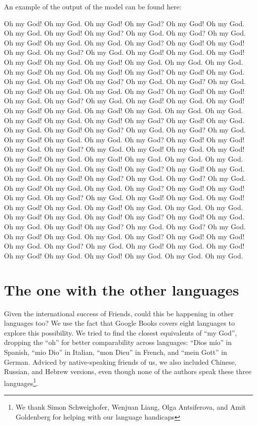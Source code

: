 \documentclass[]{article}
\begin{document}
An example of the output of the model can be found here:

{
Oh my God! Oh my God. Oh my God! Oh my God? Oh my God! Oh my God. Oh my God. Oh my God! Oh my God? Oh my God. Oh my God? Oh my God. Oh my God! Oh my God. Oh my God. Oh my God? Oh my God! Oh my God! Oh my God. Oh my God? Oh my God. Oh my God! Oh my God. Oh my God! Oh my God! Oh my God. Oh my God! Oh my God. Oh my God. Oh my God. Oh my God! Oh my God. Oh my God! Oh my God? Oh my God! Oh my God. Oh my God. Oh my God! Oh my God? Oh my God. Oh my God? Oh my God. Oh my God! Oh my God. Oh my God. Oh my God? Oh my God! Oh my God! Oh my God. Oh my God? Oh my God. Oh my God! Oh my God. Oh my God! Oh my God! Oh my God. Oh my God! Oh my God. Oh my God. Oh my God. Oh my God! Oh my God. Oh my God! Oh my God? Oh my God! Oh my God. Oh my God. Oh my God! Oh my God? Oh my God. Oh my God? Oh my God. Oh my God! Oh my God. Oh my God. Oh my God? Oh my God! Oh my God! Oh my God. Oh my God? Oh my God. Oh my God! Oh my God. Oh my God! Oh my God! Oh my God. Oh my God! Oh my God. Oh my God. Oh my God. Oh my God! Oh my God. Oh my God! Oh my God? Oh my God! Oh my God. Oh my God. Oh my God! Oh my God? Oh my God. Oh my God? Oh my God. Oh my God! Oh my God. Oh my God. Oh my God? Oh my God! Oh my God! Oh my God. Oh my God? Oh my God. Oh my God! Oh my God. Oh my God! Oh my God! Oh my God. Oh my God! Oh my God. Oh my God. Oh my God. Oh my God! Oh my God. Oh my God! Oh my God? Oh my God! Oh my God. Oh my God. Oh my God! Oh my God? Oh my God. Oh my God? Oh my God. Oh my God! Oh my God. Oh my God. Oh my God? Oh my God! Oh my God! Oh my God. Oh my God? Oh my God. Oh my God! Oh my God. Oh my God! Oh my God! Oh my God. Oh my God! Oh my God. Oh my God. Oh my God.
}

\newpage


\hypertarget{the-one-with-the-other-languages}{%
\section{The one with the other languages}\label{the-one-with-the-other-languages}}

Given the international success of Friends, could this be happening in other languages too? We use the fact that Google Books covers eight languages to explore this possibility. We tried to find the closest equivalents of ``my God'', dropping the ``oh'' for better comparability across languages: ``Dios mío'' in Spanish, ``mio Dio'' in Italian, ``mon Dieu'' in French, and ``mein Gott'' in German. Adviced by native-speaking friends of us, we also included Chinese, Russian, and Hebrew versions, even though none of the authors speak these three languages\footnote{We thank Simon Schweighofer, Wenjuan Liang, Olga Antsiferova, and Amit Goldenberg for helping with our language handicaps}.
\end{document}
